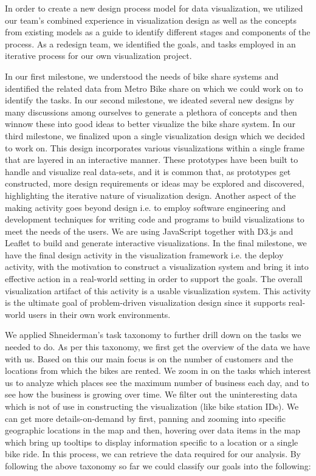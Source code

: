 In order to create a new design process model for data visualization, we utilized our team’s combined experience in visualization design as well as the concepts from existing models as a guide to identify different stages and components of the process. As a redesign team, we identified the goals, and tasks employed in an iterative process for our own visualization project. 

In our first milestone, we understood the needs of bike share systems and identified the related data from Metro Bike share on which we could work on to identify the tasks. In our second milestone, we ideated several new designs by many discussions among ourselves to generate a plethora of concepts and then winnow these into good ideas to better visualize the bike share system. In our third milestone, we finalized upon a single visualization design which we decided to work on. This design incorporates various visualizations within a single frame that are layered in an interactive manner. These prototypes have been built to handle and visualize real data-sets, and it is common that, as prototypes get constructed, more design requirements or ideas may be explored and discovered, highlighting the iterative nature of visualization design. Another aspect of the making activity goes beyond design i.e. to employ software engineering and development techniques for writing code and programs to build visualizations to meet the needs of the users. We are using JavaScript together with D3.js and Leaflet to build and generate interactive visualizations. In the final milestone, we have the final design activity in the visualization framework i.e. the deploy activity, with the motivation to construct a visualization system and bring it into effective action in a real-world setting in order to support the goals. The overall visualization artifact of this activity is a usable visualization system. This activity is the ultimate goal of problem-driven visualization design since it supports real-world users in their own work environments. 

We applied Shneiderman's task taxonomy to further drill down on the tasks we needed to do. As per this taxonomy, we first get the overview of the data we have with us. Based on this our main focus is on the number of customers and the locations from which the bikes are rented. We zoom in on the tasks which interest us to analyze which places see the maximum number of business each day, and to see how the business is growing over time. We filter out the uninteresting data which is not of use in constructing the visualization (like bike station IDs). We can get more details-on-demand by first, panning and zooming into specific geographic locations in the map and then, hovering over data items in the map which bring up tooltips to display information specific to a location or a single bike ride. In this process, we can retrieve the data required for our analysis. By following the above taxonomy so far we could classify our goals into the following:

